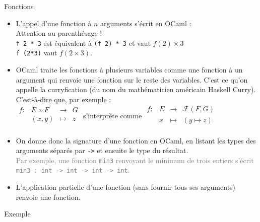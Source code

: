 \documentclass[10pt]{beamer}
\begin{document}
\begin{frame}{\Ctitle}{\stitle}
	\begin{block}{Fonctions}
		\begin{itemize}
			\item <1-> L'appel d'une fonction  à $n$ arguments s'écrit en OCaml :   \\
			      \textcolor{BrickRed}{\danger \;} Attention au parenthésage ! \\
			      {\tt f 2 * 3} est équivalent à {\tt (f 2) * 3} et vaut $f(2) \times 3$ \\
			      {\tt f (2*3)} vaut $f(2\times3)$.
			\item<2-> OCaml traite les fonctions à plusieurs variables comme une fonction à un argument qui renvoie une fonction sur le reste des variables. C'est ce qu'on appelle la \textcolor{BrickRed}{curryfication} (du nom du mathématicien américain Haskell Curry). C'est-à-dire que, par exemple : \\
				$\begin{array}{llll}
						f : & E \times F & \rightarrow & G \\
						    & (x,y)      & \mapsto    & z \\
					\end{array}$ s'interprète comme
				$\begin{array}{llll}
						f : & E & \rightarrow & \mathcal{F}{(F,G)} \\
						    & x & \mapsto    & (y \mapsto z)      \\
					\end{array}$
			\item<3-> On donne donc la signature d'une fonction en OCaml, en listant les types des arguments séparés par {\tt ->} et ensuite le type du résultat.\\
			\onslide<4->\textcolor{gray}{Par exemple, une fonction {\tt min3} renvoyant le minimum de trois entiers s'écrit {\tt min3 : int -> int -> int -> int}.}
			\item<5-> L'application partielle d'une fonction (sans fournir tous ses arguments) renvoie une fonction.

		\end{itemize}
	\end{block}
\end{frame}

\begin{frame}{\Ctitle}{\stitle}
	\begin{exampleblock}{Exemple}
	\end{exampleblock}
\end{frame}
\end{document}
